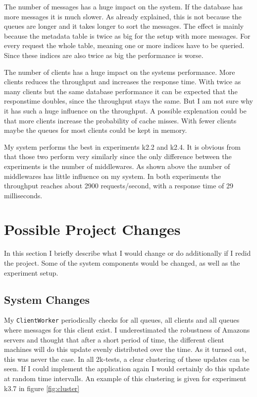 \documentclass[
10pt, %
a4paper, %
oneside, %
headinclude,footinclude, %
BCOR5mm, %
]{scrartcl}
\begin{document}
The number of messages has a huge impact on the system. If the database has more messages it is much slower. As already explained, this is not because the queues are longer and it takes longer to sort the messages. The effect is mainly because the metadata table is twice as big for the setup with more messages. For every request the whole table, meaning one or more indices have to be queried. Since these indices are also twice as big the performance is worse. 


The number of clients has a huge impact on the systems performance. More clients reduces the throughput and increases the response time. With twice as many clients but the same database performance it can be expected that the responstime doubles, since the throughput stays the same. But I am not sure why it has such a huge influence on the throughput. A possible explenation could be that more clients increase the probability of cache misses. With fewer clients maybe the queues for most clients could be kept in memory. 



My system performs the best in experiments k2.2 and k2.4. It is obvious from that those two perform very similarly since the only difference between the experiments is the number of middlewares. As shown above the number of middlewares has little influence on my system. In both experiments the throughput reaches about 2900 requests/second, with a response time of 29 milliseconds.

\section{Possible Project Changes}
In this section I briefly describe what I would change or do additionally if I redid the project. Some of the system components would be changed, as well as the experiment setup.
\subsection{System Changes}
\label{changes}
My \texttt{ClientWorker} periodically checks for all queues, all clients and all queues where messages for this client exist. I underestimated the robustness of Amazons servers and thought that after a short period of time, the different client machines will do this update evenly distributed over the time. As it turned out, this was never the case. In all 2k-tests, a clear clustering of these updates can be seen. If I could implement the application again I would certainly do this update at random time intervalls. An example of this clustering is given for experiment k3.7 in figure \vref{fig:cluster}
\end{document}
